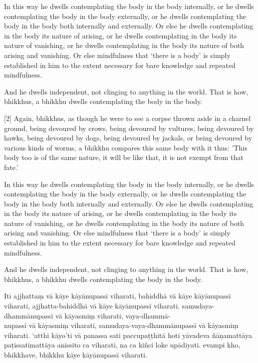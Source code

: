 \englishPage

In this way he dwells contemplating the body in the body internally, or he
dwells contemplating the body in the body externally, or he dwells contemplating
the body in the body both internally and externally. Or else he dwells
contemplating in the body its nature of arising, or he dwells contemplating in
the body its nature of vanishing, or he dwells contemplating in the body its
nature of both arising and vanishing. Or else mindfulness that ‘there is a body’
is simply established in him to the extent necessary for bare knowledge and
repeated mindfulness.

And he dwells independent, not clinging to anything in the world. That is how,
bhikkhus, a bhikkhu dwells contemplating the body in the body.

[2] Again, bhikkhus, as though he were to see a corpse thrown aside in a charnel
ground, being devoured by crows, being devoured by vultures, being devoured by
hawks, being devoured by dogs, being devoured by jackals, or being devoured by
various kinds of worms, a bhikkhu compares this same body with it thus: 'This
body too is of the same nature, it will be like that, it is not exempt from that
fate.'

In this way he dwells contemplating the body in the body internally, or he
dwells contemplating the body in the body externally, or he dwells contemplating
the body in the body both internally and externally. Or else he dwells
contemplating in the body its nature of arising, or he dwells contemplating in
the body its nature of vanishing, or he dwells contemplating in the body its
nature of both arising and vanishing. Or else mindfulness that ‘there is a body’
is simply established in him to the extent necessary for bare knowledge and
repeated mindfulness.

And he dwells independent, not clinging to anything in the world. That is how,
bhikkhus, a bhikkhu dwells contemplating the body in the body.

\paliPage

Iti ajjhattaṃ vā kāye kāyānupassī viharati, bahiddhā vā kāye kāyānupassī
viharati, ajjhatta-bahiddhā vā kāye kāyānupassī viharati. samudaya-dhammānupassī
vā kāyasmiṃ viharati, vaya-dhammā-\\
nupassī vā kāyasmiṃ viharati, samudaya-vaya-dhammānupassī vā kāyasmiṃ viharati.
‘atthi kāyo’ti vā panassa sati paccupaṭṭhitā hoti yāvadeva ñāṇamattāya
paṭissatimattāya anissito ca viharati, na ca kiñci loke upādiyati. evampi kho,
bhikkhave, bhikkhu kāye kāyānupassī viharati.

